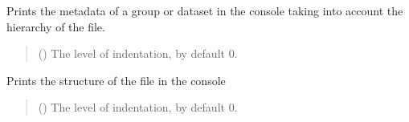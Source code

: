 \documentclass[letterpaper,10pt,english]{sphinxmanual}
\begin{document}
\begin{fulllineitems}
\begin{fulllineitems}
\begin{quote}
\begin{description}
\end{description}\end{quote}

\end{fulllineitems}


\begin{fulllineitems}
\label{\detokenize{_autosummary/HDF5_BLS.wrapper:HDF5_BLS.wrapper.Wrapper.print_metadata}}
\pysigstartsignatures
\pysiglinewithargsret
{}
{}
{}
\pysigstopsignatures
\sphinxAtStartPar
Prints the metadata of a group or dataset in the console taking into account the hierarchy of the file.
\begin{quote}\begin{description}
\sphinxAtStartPar
{} (\sphinxstyleliteralemphasis{\sphinxupquote{, }}) \textendash{} The level of indentation, by default 0.

\end{description}\end{quote}

\end{fulllineitems}


\begin{fulllineitems}
\label{\detokenize{_autosummary/HDF5_BLS.wrapper:HDF5_BLS.wrapper.Wrapper.print_structure}}
\pysigstartsignatures
\pysiglinewithargsret
{}
{}
{}
\pysigstopsignatures
\sphinxAtStartPar
Prints the structure of the file in the console
\begin{quote}\begin{description}
\sphinxAtStartPar
{} (\sphinxstyleliteralemphasis{\sphinxupquote{, }}) \textendash{} The level of indentation, by default 0.


\end{description}
\end{quote}
\end{fulllineitems}
\end{fulllineitems}
\end{document}
